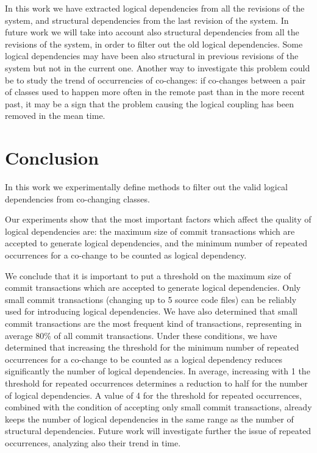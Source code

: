 \documentclass[a4paper,twoside]{article}
\begin{document}
In this work we have extracted logical dependencies from all the revisions of the system, and structural dependencies from the last revision of the system. In future work we will take into account also structural dependencies from all the revisions of the system, in order to filter out the old logical dependencies.  Some logical dependencies may have been also structural in previous revisions of the system but not in the current one. Another way to investigate this problem could be to study the trend of occurrencies of co-changes: if co-changes between a pair of classes used to happen more often in the remote past than in the more recent past, it may be a sign that the problem causing the logical coupling has been removed in the mean time. 



\section{Conclusion}
\label{sec:Conclusion}
   
In this work we experimentally define methods to filter out the valid logical dependencies from co-changing classes. 


Our experiments show that the most important factors which affect the quality of logical dependencies are: the maximum size of commit transactions which are accepted to generate logical dependencies, and the minimum number of repeated occurrences for a co-change to be counted as logical dependency. 

We conclude that it is important to put a threshold on the maximum size of commit transactions which are accepted to generate logical dependencies. Only small commit transactions (changing up to 5 source code files) can be reliably used for introducing logical dependencies. We have also determined that small commit transactions are the most frequent kind of transactions, representing in average 80\% of all commit transactions. Under these conditions, we have determined that increasing the threshold for the minimum number of repeated occurrences for a co-change to be counted as a logical dependency reduces significantly the number of logical dependencies. In average, increasing with 1 the threshold for repeated occurrences determines a reduction to half for the number of logical dependencies.  A value of 4 for the threshold for repeated occurrences, combined with the condition of accepting only small commit transactions, already keeps the number of logical dependencies in the same range as the number of structural dependencies. Future work will investigate further the issue of repeated occurrences, analyzing also their trend in time. 
\end{document}
